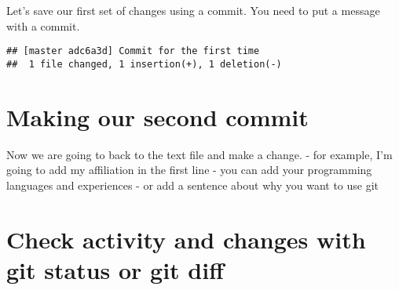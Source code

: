 \documentclass[]{article}
\begin{document}
Let's save our first set of changes using a commit. You need to put a
message with a commit.

\begin{verbatim}
## [master adc6a3d] Commit for the first time
##  1 file changed, 1 insertion(+), 1 deletion(-)
\end{verbatim}

\section{Making our second commit}\label{making-our-second-commit}

Now we are going to back to the text file and make a change. - for
example, I'm going to add my affiliation in the first line - you can add
your programming languages and experiences - or add a sentence about why
you want to use git

\section{Check activity and changes with git status or git
diff}\label{check-activity-and-changes-with-git-status-or-git-diff}
\end{document}
